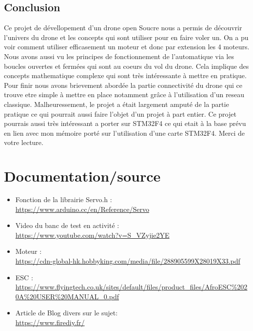 \documentclass[10pt,a4paper]{article}
\begin{document}
\newpage
{}        
\begin{center}
\section*{Conclusion}
Ce projet de dévellopement d'un drone open Soucre nous a permis de découvrir l'univers du drone et les concepts qui sont utiliser pour en faire voler un. On a pu voir comment utiliser efficasement un moteur et donc par extension les 4 moteurs. Nous avons aussi vu les principes de fonctionnement de l'automatique via les boucles ouvertes et fermées qui sont au coeurs du vol du drone. Cela implique des concepts mathematique complexe qui sont très intéressante à mettre en pratique. Pour finir nous avons brievement abordée la partie connectivité du drone qui ce trouve etre simple à mettre en place notamment grâce à l'utilisation d'un reseau classique. Malheuressement, le projet a était largement amputé de la partie pratique ce qui pourrait aussi faire l'objet d'un projet à part entier. Ce projet pourrais aussi très intéressant a porter sur STM32F4 ce qui etait à la base prévu en lien avec mon mémoire porté sur l'utilisation d'une carte STM32F4. 
Merci de votre lecture. 

\end{center}

\newpage
\section*{Documentation/source}
\begin{itemize}
 \item Fonction de la librairie Servo.h :\\
\url{https://www.arduino.cc/en/Reference/Servo}
\item Video du banc de test en activité : \\
\url{https://www.youtube.com/watch?v=S_VZyjie2YE}
\item Moteur : \\
\url{https://cdn-global-hk.hobbyking.com/media/file/288905599X28019X33.pdf}
\item ESC :\\
\url{https://www.flyingtech.co.uk/sites/default/files/product_files/AfroESC\%2020A\%20USER\%20MANUAL\_0.pdf}
\item Article de Blog divers sur le sujet: \\
\url{https://www.firediy.fr/}
\end{itemize}
\end{document}
